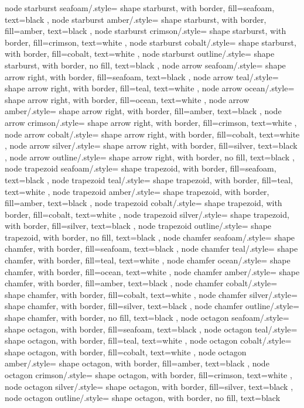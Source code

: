 {	node starburst seafoam/.style={
		shape starburst, with border,
		fill=seafoam, text=black
	},
	node starburst amber/.style={
		shape starburst, with border,
		fill=amber, text=black
	},
	node starburst crimson/.style={
		shape starburst, with border,
		fill=crimson, text=white
	},
	node starburst cobalt/.style={
		shape starburst, with border,
		fill=cobalt, text=white
	},
	node starburst outline/.style={
		shape starburst, with border,
		no fill, text=black
	},
	node arrow seafoam/.style={
		shape arrow right, with border,
		fill=seafoam, text=black
	},
	node arrow teal/.style={
		shape arrow right, with border,
		fill=teal, text=white
	},
	node arrow ocean/.style={
		shape arrow right, with border,
		fill=ocean, text=white
	},
	node arrow amber/.style={
		shape arrow right, with border,
		fill=amber, text=black
	},
	node arrow crimson/.style={
		shape arrow right, with border,
		fill=crimson, text=white
	},
	node arrow cobalt/.style={
		shape arrow right, with border,
		fill=cobalt, text=white
	},
	node arrow silver/.style={
		shape arrow right, with border,
		fill=silver, text=black
	},
	node arrow outline/.style={
		shape arrow right, with border,
		no fill, text=black
	},
	node trapezoid seafoam/.style={
		shape trapezoid, with border,
		fill=seafoam, text=black
	},
	node trapezoid teal/.style={
		shape trapezoid, with border,
		fill=teal, text=white
	},
	node trapezoid amber/.style={
		shape trapezoid, with border,
		fill=amber, text=black
	},
	node trapezoid cobalt/.style={
		shape trapezoid, with border,
		fill=cobalt, text=white
	},
	node trapezoid silver/.style={
		shape trapezoid, with border,
		fill=silver, text=black
	},
	node trapezoid outline/.style={
		shape trapezoid, with border,
		no fill, text=black
	},
	node chamfer seafoam/.style={
		shape chamfer, with border,
		fill=seafoam, text=black
	},
	node chamfer teal/.style={
		shape chamfer, with border,
		fill=teal, text=white
	},
	node chamfer ocean/.style={
		shape chamfer, with border,
		fill=ocean, text=white
	},
	node chamfer amber/.style={
		shape chamfer, with border,
		fill=amber, text=black
	},
	node chamfer cobalt/.style={
		shape chamfer, with border,
		fill=cobalt, text=white
	},
	node chamfer silver/.style={
		shape chamfer, with border,
		fill=silver, text=black
	},
	node chamfer outline/.style={
		shape chamfer, with border,
		no fill, text=black
	},
	node octagon seafoam/.style={
		shape octagon, with border,
		fill=seafoam, text=black
	},
	node octagon teal/.style={
		shape octagon, with border,
		fill=teal, text=white
	},
	node octagon cobalt/.style={
		shape octagon, with border,
		fill=cobalt, text=white
	},
	node octagon amber/.style={
		shape octagon, with border,
		fill=amber, text=black
	},
	node octagon crimson/.style={
		shape octagon, with border,
		fill=crimson, text=white
	},
	node octagon silver/.style={
		shape octagon, with border,
		fill=silver, text=black
	},
	node octagon outline/.style={
		shape octagon, with border,
		no fill, text=black
	}
}